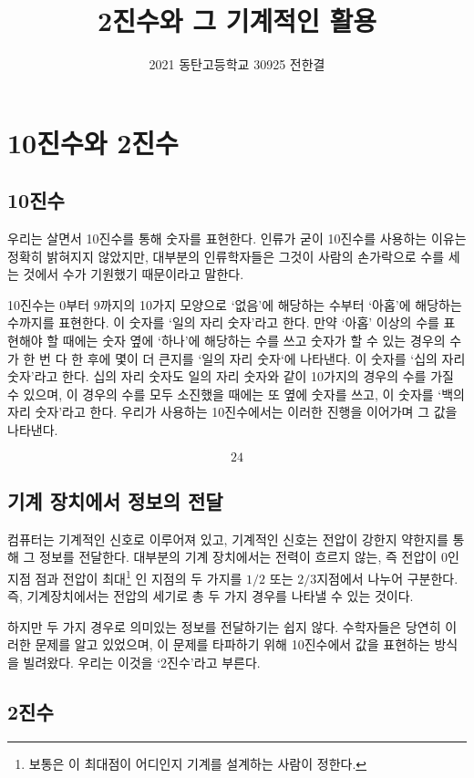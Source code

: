 \documentclass{article}
\title{2진수와 그 기계적인 활용}
\author{2021 동탄고등학교 30925 전한결}
\begin{document}
    
\maketitle

\tableofcontents

\section{10진수와 2진수}

\subsection{10진수}

우리는 살면서 10진수를 통해 숫자를 표현한다.
인류가 굳이 10진수를 사용하는 이유는 정확히 밝혀지지 않았지만,
대부분의 인류학자들은 그것이 사람의 손가락으로 수를 세는 것에서
수가 기원했기 때문이라고 말한다.

10진수는 0부터 9까지의 10가지 모양으로 `없음'에 해당하는 수부터 `아홉'에 해당하는
수까지를 표현한다. 이 숫자를 `일의 자리 숫자'라고 한다.
만약 `아홉' 이상의 수를 표현해야 할 때에는 숫자 옆에 `하나'에
해당하는 수를 쓰고 숫자가 할 수 있는 경우의 수가 한 번 다 한 후에 몇이 더 큰지를
`일의 자리 숫자`에 나타낸다. 이 숫자를 `십의 자리 숫자'라고 한다.
십의 자리 숫자도 일의 자리 숫자와 같이 10가지의 경우의 수를 가질 수 있으며,
이 경우의 수를 모두 소진했을 때에는 또 옆에 숫자를 쓰고, 이 숫자를
`백의 자리 숫자'라고 한다.
우리가 사용하는 10진수에서는 이러한 진행을 이어가며 그 값을 나타낸다.

$$
24
$$

\subsection{기계 장치에서 정보의 전달}

컴퓨터는 기계적인 신호로 이루어져 있고, 기계적인 신호는 전압이 강한지 약한지를 통해
그 정보를 전달한다. 대부분의 기계 장치에서는 전력이 흐르지 않는, 즉 전압이 0인 지점
점과 전압이 최대\footnote{보통은 이 최대점이 어디인지 기계를 설계하는 사람이 정한다.}
인 지점의 두 가지를 $1/2$ 또는 $2/3$지점에서 나누어 구분한다.
즉, 기계장치에서는 전압의 세기로 총 두 가지 경우를 나타낼 수 있는 것이다.

하지만 두 가지 경우로 의미있는 정보를 전달하기는 쉽지 않다. 수학자들은 당연히 이러한
문제를 알고 있었으며, 이 문제를 타파하기 위해 10진수에서 값을 표현하는 방식을 빌려왔다.
우리는 이것을 `2진수'라고 부른다.

\subsection{2진수}
\end{document}
